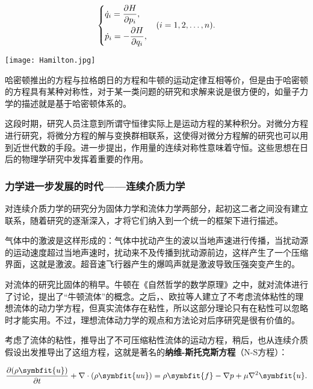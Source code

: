 \[
    \begin{dcases}
        \dot{q}_i=\dfrac{\partial H}{\partial p_i},  \\
        \dot{p}_i=-\dfrac{\partial H}{\partial q_i}, \\
    \end{dcases} \quad \left( i=1,2,\dots ,n \right)
    .\]

\begin{marginparfigure}
    \texttt{[image: Hamilton.jpg]}
\end{marginparfigure}

哈密顿推出的方程与拉格朗日的方程和牛顿的运动定律互相等价，但是由于哈密顿的方程具有某种对称性，对于某一类问题的研究和求解来说是很方便的，如量子力学的描述就是基于哈密顿体系的。

这段时期，研究人员注意到所谓守恒律实际上是运动方程的某种积分。对微分方程进行研究，将微分方程的解与变换群相联系，这使得对微分方程解的研究也可以用到近世代数的手段。进一步提出，作用量的连续对称性意味着守恒。这些思想在日后的物理学研究中发挥着重要的作用。

\subsubsection{力学进一步发展的时代——连续介质力学}

对连续介质力学的研究分为固体力学和流体力学两部分，起初这二者之间没有建立联系，随着研究的逐渐深入，才将它们纳入到一个统一的框架下进行描述。

\begin{marginpartext}
        气体中的激波是这样形成的：气体中扰动产生的波以当地声速进行传播，当扰动源的运动速度超过当地声速时，扰动来不及传播到扰动源前边，这样产生了一个压缩界面，这就是激波。超音速飞行器产生的爆鸣声就是激波导致压强突变产生的。
\end{marginpartext}

对流体的研究比固体的稍早。牛顿在《自然哲学的数学原理》之中，就对流体进行了讨论，提出了“牛顿流体”的概念。之后，、欧拉等人建立了不考虑流体粘性的理想流体的动力学方程，但真实流体存在粘性，所以这部分理论只有在粘性可以忽略时才能实用。不过，理想流体动力学的观点和方法论对后序研究是很有价值的。

考虑了流体的粘性，推导出了不可压缩粘性流体的运动方程，稍后，也从连续介质假设出发推导出了这组方程，这就是著名的\textbf{纳维-斯托克斯方程}（N-S方程）：

\[
    \frac{\partial(\rho\symbfit{u})}{\partial t}+\nabla\cdot(\rho\symbfit{uu})=\rho\symbfit{f}-\nabla p+\mu\nabla ^2\symbfit{u}
    .\]

